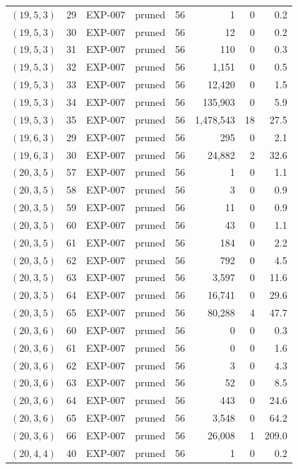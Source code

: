 \begin{longtable}{lrllrrrr}
$(19,5,3)$ & 29 & EXP-007 & pruned & 56 & 1 & 0 & 0.2 \\
$(19,5,3)$ & 30 & EXP-007 & pruned & 56 & 12 & 0 & 0.2 \\
$(19,5,3)$ & 31 & EXP-007 & pruned & 56 & 110 & 0 & 0.3 \\
$(19,5,3)$ & 32 & EXP-007 & pruned & 56 & 1{,}151 & 0 & 0.5 \\
$(19,5,3)$ & 33 & EXP-007 & pruned & 56 & 12{,}420 & 0 & 1.5 \\
$(19,5,3)$ & 34 & EXP-007 & pruned & 56 & 135{,}903 & 0 & 5.9 \\
$(19,5,3)$ & 35 & EXP-007 & pruned & 56 & 1{,}478{,}543 & 18 & 27.5 \\
$(19,6,3)$ & 29 & EXP-007 & pruned & 56 & 295 & 0 & 2.1 \\
$(19,6,3)$ & 30 & EXP-007 & pruned & 56 & 24{,}882 & 2 & 32.6 \\
$(20,3,5)$ & 57 & EXP-007 & pruned & 56 & 1 & 0 & 1.1 \\
$(20,3,5)$ & 58 & EXP-007 & pruned & 56 & 3 & 0 & 0.9 \\
$(20,3,5)$ & 59 & EXP-007 & pruned & 56 & 11 & 0 & 0.9 \\
$(20,3,5)$ & 60 & EXP-007 & pruned & 56 & 43 & 0 & 1.1 \\
$(20,3,5)$ & 61 & EXP-007 & pruned & 56 & 184 & 0 & 2.2 \\
$(20,3,5)$ & 62 & EXP-007 & pruned & 56 & 792 & 0 & 4.5 \\
$(20,3,5)$ & 63 & EXP-007 & pruned & 56 & 3{,}597 & 0 & 11.6 \\
$(20,3,5)$ & 64 & EXP-007 & pruned & 56 & 16{,}741 & 0 & 29.6 \\
$(20,3,5)$ & 65 & EXP-007 & pruned & 56 & 80{,}288 & 4 & 47.7 \\
$(20,3,6)$ & 60 & EXP-007 & pruned & 56 & 0 & 0 & 0.3 \\
$(20,3,6)$ & 61 & EXP-007 & pruned & 56 & 0 & 0 & 1.6 \\
$(20,3,6)$ & 62 & EXP-007 & pruned & 56 & 3 & 0 & 4.3 \\
$(20,3,6)$ & 63 & EXP-007 & pruned & 56 & 52 & 0 & 8.5 \\
$(20,3,6)$ & 64 & EXP-007 & pruned & 56 & 443 & 0 & 24.6 \\
$(20,3,6)$ & 65 & EXP-007 & pruned & 56 & 3{,}548 & 0 & 64.2 \\
$(20,3,6)$ & 66 & EXP-007 & pruned & 56 & 26{,}008 & 1 & 209.0 \\
$(20,4,4)$ & 40 & EXP-007 & pruned & 56 & 1 & 0 & 0.2 \\

\end{longtable}

